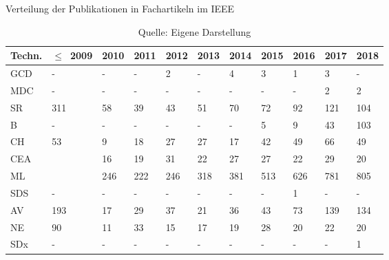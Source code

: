 \begin{table}
	\caption{Verteilung der Publikationen in Fachartikeln im \glqq \ac{IEEE}\grqq}
	\selectfont
	\footnotesize
	\centering
	\label{tab:dist_ieee_art}
\begin{tabularx}{\linewidth}{XXXXXXXXXXX}
	\hline
	Techn. & $\leq$~2009 & 2010 & 2011 & 2012 & 2013 & 2014 & 2015 & 2016 & 2017 & 2018 \\
	\hline
	\acs{GCD} & - & - & - & 2 & - & 4 & 3 & 1 & 3 & - \\
	\acs{MDC} & - & - & - & - & - & - & - & - & 2 & 2 \\
	\acs{SR} & 311 & 58 & 39 & 43 & 51 & 70 & 72 & 92 & 121 & 104 \\
	\acs{B} & - & - & - & - & - & - & 5 & 9 & 43 & 103 \\
	\acs{CH} & 53 & 9 & 18 & 27 & 27 & 17 & 42 & 49 & 66 & 49 \\
	\acs{CEA} & \numprint{2072} & 16 & 19 & 31 & 22 & 27 & 27 & 22 & 29 & 20 \\
	\acs{ML} & \numprint{1551} & 246 & 222 & 246 & 318 & 381 & 513 & 626 & 781 & 805 \\
	\acs{SDS} & - & - & - & - & - & - & - & 1 & - & - \\
	\acs{AV} & 193 & 17 & 29 & 37 & 21 & 36 & 43 & 73 & 139 & 134 \\
	\acs{NE} & 90 & 11 & 33 & 15 & 17 & 19 & 28 & 20 & 22 & 20 \\
	\acs{SDx} & - & - & - & - & - & - & - & - & - & 1 \\
	\hline
\end{tabularx}
\caption*{Quelle: Eigene Darstellung}
\end{table}

